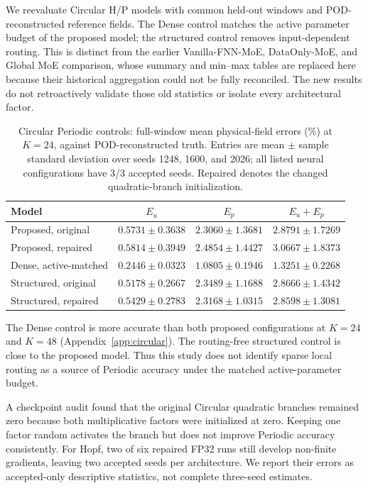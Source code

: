 \documentclass{article}
\begin{document}
We reevaluate Circular H/P models with common held-out windows and
POD-reconstructed reference fields. The Dense control matches the active
parameter budget of the proposed model; the structured control removes
input-dependent routing. This is distinct from the earlier
Vanilla-FNN-MoE, DataOnly-MoE, and Global MoE comparison, whose summary and
min--max tables are replaced here because their historical aggregation
could not be fully reconciled. The new results do not retroactively
validate those old statistics or isolate every architectural factor.



\begin{table}[H]
\centering
\caption{Circular Periodic controls: full-window mean physical-field
errors (\%) at $K=24$, against POD-reconstructed truth. Entries are mean
$\pm$ sample standard deviation over seeds 1248, 1600, and 2026; all
listed neural configurations have 3/3 accepted seeds. Repaired denotes
the changed quadratic-branch initialization.}
\label{tab:circular_full_reorg}
\small
\setlength{\tabcolsep}{4pt}
\begin{tabular}{@{}lccc@{}}
\toprule
Model & $E_u$ & $E_p$ & $E_u+E_p$\\
\midrule
Proposed, original & $0.5731\pm0.3638$ & $2.3060\pm1.3681$ & $2.8791\pm1.7269$\\
Proposed, repaired & $0.5814\pm0.3949$ & $2.4854\pm1.4427$ & $3.0667\pm1.8373$\\
Dense, active-matched & $\mathbf{0.2446\pm0.0323}$ & $\mathbf{1.0805\pm0.1946}$ & $\mathbf{1.3251\pm0.2268}$\\
Structured, original & $0.5178\pm0.2667$ & $2.3489\pm1.1688$ & $2.8666\pm1.4342$\\
Structured, repaired & $0.5429\pm0.2783$ & $2.3168\pm1.0315$ & $2.8598\pm1.3081$\\
\bottomrule
\end{tabular}
\end{table}



The Dense control is more accurate than both proposed configurations at
$K=24$ and $K=48$ (Appendix~\ref{app:circular}). The routing-free
structured control is close to the proposed model. Thus this study does
not identify sparse local routing as a source of Periodic accuracy under
the matched active-parameter budget.

A checkpoint audit found that the original Circular quadratic branches
remained zero because both multiplicative factors were initialized at
zero. Keeping one factor random activates the branch but does not improve
Periodic accuracy consistently. For Hopf, two of six repaired FP32 runs
still develop non-finite gradients, leaving two accepted seeds per
architecture. We report their errors as accepted-only descriptive
statistics, not complete three-seed estimates.
\end{document}
